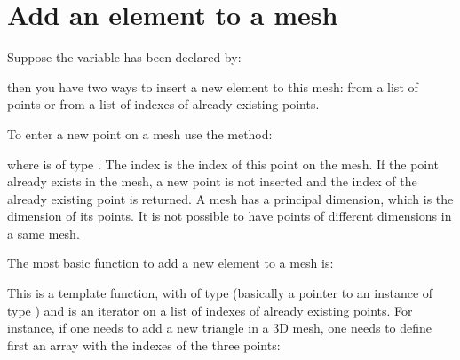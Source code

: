 \documentclass[a4paper,11pt,english]{sphinxmanual}
\begin{document}
\section{Add an element to a mesh}
\label{\detokenize{userdoc/bmesh:add-an-element-to-a-mesh}}
Suppose the variable  has been declared by:

\begin{sphinxVerbatim}[commandchars=\\\{\}]
 
\end{sphinxVerbatim}

then you have two ways to insert a new element to this mesh: from a list of
points or from a list of indexes of already existing points.

To enter a new point on a mesh use the method:

\begin{sphinxVerbatim}[commandchars=\\\{\}]
  
\end{sphinxVerbatim}

where  is of type . The index  is the index of this point on
the mesh. If the point already exists in the mesh, a new point is not inserted
and the index of the already existing point is returned. A mesh has a principal
dimension, which is the dimension of its points. It is not possible to have
points of different dimensions in a same mesh.

The most basic function to add a new element to a mesh is:

\begin{sphinxVerbatim}[commandchars=\\\{\}]
   
\end{sphinxVerbatim}

This is a template function, with  of type  (basically a pointer
to an instance of type ) and  is an iterator on a list of indexes of
already existing points. For instance, if one needs to add a new triangle in a 3D
mesh, one needs to define first an array with the indexes of the three points:
\end{document}

